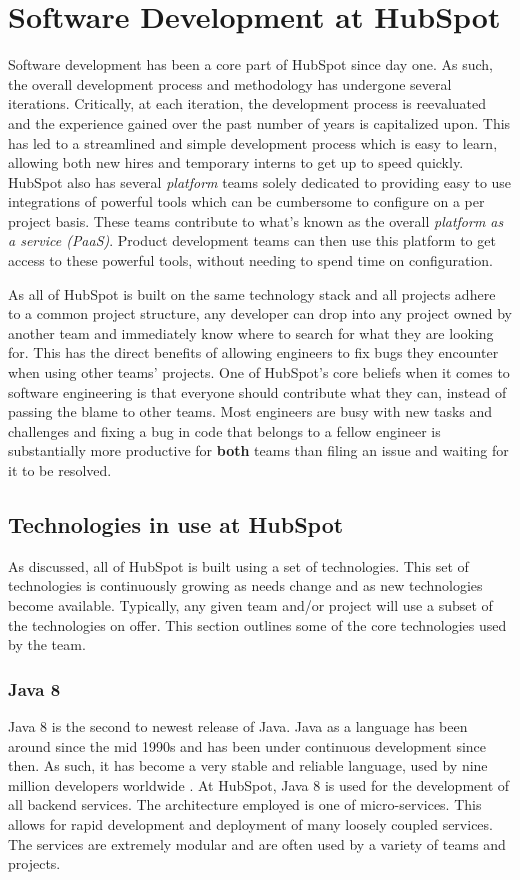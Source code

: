 \chapter{Software Development at HubSpot}
Software development has been a core part of HubSpot since day one. As such, the overall development process and methodology has undergone several iterations. Critically, at each iteration, the development process is reevaluated and the experience gained over the past number of years is capitalized upon. This has led to a streamlined and simple development process which is easy to learn, allowing both new hires and temporary interns to get up to speed quickly. HubSpot also has several \textit{platform} teams solely dedicated to providing easy to use integrations of powerful tools which can be cumbersome to configure on a per project basis. These teams contribute to what's known as the overall \textit{platform as a service (PaaS)}. Product development teams can then use this platform to get access to these powerful tools, without needing to spend time on configuration.

As all of HubSpot is built on the same technology stack and all projects adhere to a common project structure, any developer can drop into any project owned by another team and immediately know where to search for what they are looking for. This has the direct benefits of allowing engineers to fix bugs they encounter when using other teams' projects. One of HubSpot's core beliefs when it comes to software engineering is that everyone should contribute what they can, instead of passing the blame to other teams. Most engineers are busy with new tasks and challenges and fixing a bug in code that belongs to a fellow engineer is substantially more productive for \textbf{both} teams than filing an issue and waiting for it to be resolved. 

\section{Technologies in use at HubSpot}
As discussed, all of HubSpot is built using a set of technologies. This set of technologies is continuously growing as needs change and as new technologies become available. Typically, any given team and/or project will use a subset of the technologies on offer. This section outlines some of the core technologies used by the \team{} team. 
\subsection{Java 8}
Java 8 is the second to newest release of Java. Java as a language has been around since the mid 1990s and has been under continuous development since then. As such, it has become a very stable and reliable language, used by nine million developers worldwide \cite{java9Million}. At HubSpot, Java 8 is used for the development of all backend services. The architecture employed is one of micro-services. This allows for rapid development and deployment of many loosely coupled services. The services are extremely modular and are often used by a variety of teams and projects. 

